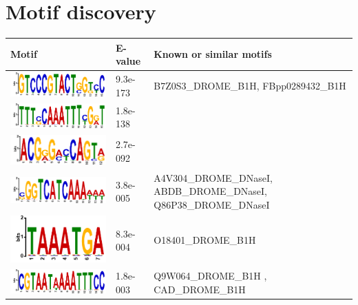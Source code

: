 \documentclass{article}
\begin{document}
{\section{Motif discovery}
\begin{longtable}{|m{6.5cm}|m{1.5cm}|m{5cm}|}
	\hline
	Motif & E-value & Known or similar motifs\\
	\hline
	\includegraphics[scale=0.5]{motif1.png} & 9.3e-173 & B7Z0S3\_DROME\_B1H, FBpp0289432\_B1H \\
	\hline
	\includegraphics[scale=0.5]{motif2.png} & 1.8e-138 & \\
	\hline
	\includegraphics[scale=0.5]{motif3.png} & 2.7e-092 & \\
	\hline
	\includegraphics[scale=0.5]{motif4.png} & 3.8e-005 & A4V304\_DROME\_DNaseI, ABDB\_DROME\_DNaseI, Q86P38\_DROME\_DNaseI\\
	\hline
	\includegraphics[scale=0.5]{motif5.png} & 8.3e-004 & O18401\_DROME\_B1H\\
	\hline
	\includegraphics[scale=0.5]{motif6.png} & 1.8e-003 & 	Q9W064\_DROME\_B1H , CAD\_DROME\_B1H \\

\end{longtable}}
\end{document}

